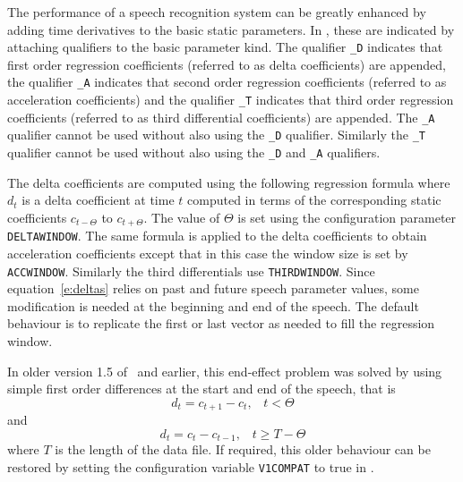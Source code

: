 
The performance of a speech recognition system can be greatly enhanced by
adding time derivatives to the basic static parameters.  In \HTK, these are
indicated by attaching qualifiers to the basic parameter kind.  The qualifier
\texttt{\_D} indicates that first order regression coefficients (referred to as
delta coefficients) are appended, the qualifier
\texttt{\_A} indicates that second order
regression coefficients (referred to as acceleration coefficients) and 
 the qualifier
\texttt{\_T} indicates that third order
regression coefficients (referred to as third differential coefficients) are
appended. The \texttt{\_A} qualifier cannot be used without also using the
\texttt{\_D} qualifier. Similarly
the \texttt{\_T} qualifier cannot be used without also using the
\texttt{\_D} and \texttt{\_A} qualifiers.

The delta coefficients are computed using the
following regression formula
where $d_t$ is a delta coefficient at time $t$ computed in terms of the
corresponding static coefficients $c_{t-\Theta}$ to $c_{t+\Theta}$.  The value
of $\Theta$ is set using the configuration parameter
\texttt{DELTAWINDOW}.  The same formula
is applied to the delta coefficients to obtain acceleration coefficients except
that in this case the window size is set by
\texttt{ACCWINDOW}. Similarly
the third differentials use \texttt{THIRDWINDOW}. Since
equation~\ref{e:deltas} relies on past and future speech parameter values, 
some modification is needed at the beginning and end of the speech.  The
default behaviour is to replicate the first or last vector as needed to fill
the regression window.

In older version 1.5 of \HTK\ and earlier, this end-effect problem was solved
by using simple 
first order differences at the start and end of the speech, that is
\begin{equation}
   d_t = c_{t+1} - c_t,\;\;\; t<\Theta
\end{equation}
and
\begin{equation}
   d_t = c_t - c_{t-1}, \;\;\; t \geq T-\Theta
\end{equation}
where $T$ is the length of the data file.  If required, this older behaviour
can be restored by setting the configuration variable 
\texttt{V1COMPAT}
to true in .

